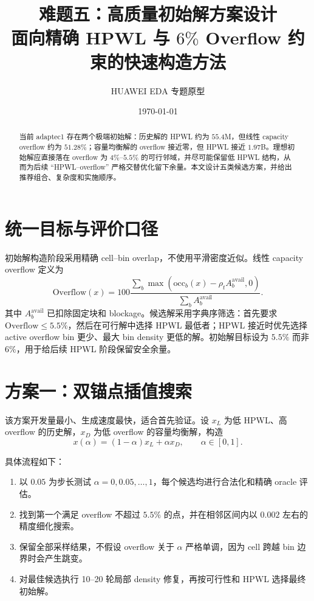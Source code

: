 \documentclass[11pt,a4paper]{ctexart}
\title{\textbf{难题五：高质量初始解方案设计}\\[0.4em]
\large 面向精确 HPWL 与 $6\%$ Overflow 约束的快速构造方法}
\author{HUAWEI EDA 专题原型}
\date{\today}
\begin{document}
\maketitle

\begin{abstract}
当前 adaptec1 存在两个极端初始解：历史解的 HPWL 约为 $55.4$M，但线性 capacity overflow 约为 $51.28\%$；容量均衡解的 overflow 接近零，但 HPWL 接近 $1.97$B。理想初始解应直接落在 overflow 为 $4\%$--$5.5\%$ 的可行邻域，并尽可能保留低 HPWL 结构，从而为后续 ``HPWL--overflow'' 严格交替优化留下余量。本文设计五类候选方案，并给出推荐组合、复杂度和实施顺序。
\end{abstract}

\section{统一目标与评价口径}

初始解构造阶段采用精确 cell--bin overlap，不使用平滑密度近似。线性 capacity overflow 定义为
\begin{equation}
  \mathrm{Overflow}(x)=
  100\frac{\sum_b\max\!\left(\mathrm{occ}_b(x)-\rho_t A_b^{\mathrm{avail}},0\right)}
  {\sum_b A_b^{\mathrm{avail}}}.
\end{equation}
其中 $A_b^{\mathrm{avail}}$ 已扣除固定块和 blockage。候选解采用字典序筛选：首先要求 $\mathrm{Overflow}\leq5.5\%$，然后在可行解中选择 HPWL 最低者；HPWL 接近时优先选择 active overflow bin 更少、最大 bin density 更低的解。初始解目标设为 $5.5\%$ 而非 $6\%$，用于给后续 HPWL 阶段保留安全余量。

\section{方案一：双锚点插值搜索}

该方案开发量最小、生成速度最快，适合首先验证。设 $x_L$ 为低 HPWL、高 overflow 的历史解，$x_D$ 为低 overflow 的容量均衡解，构造
\begin{equation}
  x(\alpha)=(1-\alpha)x_L+\alpha x_D,\qquad \alpha\in[0,1].
\end{equation}

具体流程如下：
\begin{enumerate}
  \item 以 $0.05$ 为步长测试 $\alpha=0,0.05,\ldots,1$，每个候选均进行合法化和精确 oracle 评估。
  \item 找到第一个满足 overflow 不超过 $5.5\%$ 的点，并在相邻区间内以 $0.002$ 左右的精度细化搜索。
  \item 保留全部采样结果，不假设 overflow 关于 $\alpha$ 严格单调，因为 cell 跨越 bin 边界时会产生跳变。
  \item 对最佳候选执行 10--20 轮局部 density 修复，再按可行性和 HPWL 选择最终初始解。
\end{enumerate}
\end{document}

